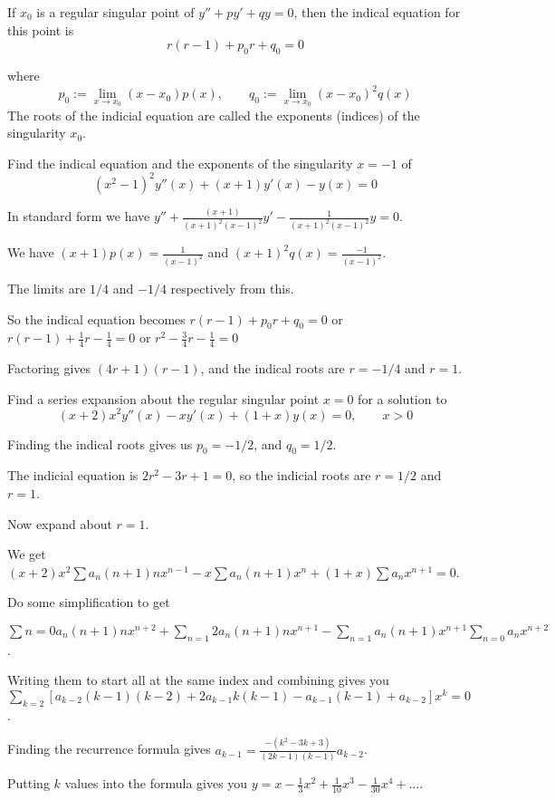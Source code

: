 \documentclass[../diffeq.tex]{subfiles}
\begin{document}
\pagebreak
\begin{definition}
    If $x_0$ is a regular singular point of $y''+py'+qy=0$, then the indical equation for this point is 
    \[ r(r-1)+p_0r+q_0=0\]

    where 
    \[ p_0 := \lim_{x\to x_0}(x-x_0)p(x), \qquad q_0 := \lim_{x\to x_0}(x-x_0)^2q(x) \]
    The roots of the indicial equation are called the exponents (indices) of the singularity $x_0$.
\end{definition}

\begin{example}
    Find the indical equation and the exponents of the singularity $x=-1$ of 
    \[ (x^2-1)^2y''(x)+(x+1)y'(x)-y(x)=0 \]

    In standard form we have $y''+\frac{(x+1)}{(x+1)^2(x-1)^2}y'-\frac{1}{(x+1)^2(x-1)^2}y=0$.

    We have $(x+1)p(x)=\frac{1}{(x-1)^2}$ and $(x+1)^2q(x)=\frac{-1}{(x-1)^2}$.

    The limits are $1/4$ and $-1/4$ respectively from this.

    So the indical equation becomes $r(r-1)+p_0r+q_0=0$ or $r(r-1)+\frac{1}{4}r-\frac{1}{4}=0$ or $r^2-\frac{3}{4}r-\frac{1}{4}=0$

    Factoring gives $(4r+1)(r-1)$, and the indical roots are $r=-1/4$ and $r=1$.
\end{example}

\begin{example}
    Find a series expansion about the regular singular point $x=0$ for a solution to 
    \[(x+2)x^2y''(x)-xy'(x)+(1+x)y(x)=0, \qquad x>0 \]

    Finding the indical roots gives us $p_0=-1/2$, and $q_0=1/2$.

    The indicial equation is $2r^2-3r+1=0$, so the indicial roots are $r=1/2$ and $r=1$.

    Now expand about $r=1$.

    We get $(x+2)x^2\sum a_n(n+1)nx^{n-1}-x\sum a_n(n+1)x^n+(1+x)\sum a_nx^{n+1}=0$.

    Do some simplification to get 
    
    $\sum{n=0} a_n(n+1)nx^{n+2}+\sum_{n=1}2a_n(n+1)nx^{n+1}-\sum_{n=1}a_n(n+1)x^{n+1}\sum_{n=0} a_n x^{n+2}$.

    Writing them to start all at the same index and combining gives you $\sum_{k=2}[a_{k-2}(k-1)(k-2)+2a_{k-1}k(k-1)-a_{k-1}(k-1)+a_{k-2}]x^k=0$.

    Finding the recurrence formula gives $a_{k-1}=\frac{-(k^2-3k+3)}{(2k-1)(k-1)}a_{k-2}$.

    Putting $k$ values into the formula gives you $y=x-\frac{1}{3}x^2+\frac{1}{10}x^3-\frac{1}{30}x^4+\dots$.
\end{example}
\end{document}

